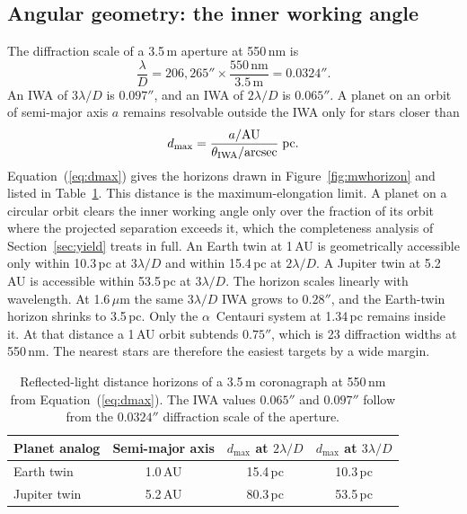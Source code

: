 \subsection{Angular geometry: the inner working angle}

The diffraction scale of a 3.5\,m aperture at 550\,nm is
\begin{equation}
\frac{\lambda}{D} = 206{,}265''\times\frac{550\,\mathrm{nm}}{3.5\,\mathrm{m}}
 = 0.0324''.
\end{equation}
An IWA of $3\lambda/D$ is $0.097''$, and an IWA of $2\lambda/D$ is
$0.065''$. A planet on an orbit of semi-major axis $a$ remains
resolvable outside the IWA only for stars closer than
\begin{equation}
d_{\max} = \frac{a/\mathrm{AU}}{\theta_{\rm IWA}/\mathrm{arcsec}}\;
\mathrm{pc}.
\label{eq:dmax}
\end{equation}
Equation~(\ref{eq:dmax}) gives the horizons drawn in
Figure~\ref{fig:mwhorizon} and listed in Table~\ref{tab:horizon}. This
distance is the maximum-elongation limit. A planet on a circular orbit
clears the inner working angle only over the fraction of its orbit where
the projected separation exceeds it, which the completeness analysis of
Section~\ref{sec:yield} treats in full. An
Earth twin at 1\,AU is geometrically accessible only within
10.3\,pc at $3\lambda/D$ and within 15.4\,pc at $2\lambda/D$. A Jupiter
twin at 5.2\,AU is accessible within 53.5\,pc at $3\lambda/D$. The
horizon scales linearly with wavelength. At 1.6\,$\mu$m the same
$3\lambda/D$ IWA grows to $0.28''$, and the Earth-twin horizon shrinks
to 3.5\,pc. Only the $\alpha$~Centauri system at 1.34\,pc
\cite{vanleeuwen07} remains inside it. At that distance a 1\,AU orbit
subtends $0.75''$, which is 23 diffraction widths at 550\,nm. The
nearest stars are therefore the easiest targets by a wide margin.

\begin{table}[tp]
\centering
\small
\begin{tabular}{lccc}
\toprule
Planet analog & Semi-major axis & $d_{\max}$ at $2\lambda/D$ &
$d_{\max}$ at $3\lambda/D$ \\
\midrule
Earth twin   & 1.0\,AU  & 15.4\,pc & 10.3\,pc \\
Jupiter twin & 5.2\,AU  & 80.3\,pc & 53.5\,pc \\
\bottomrule
\end{tabular}
\caption{Reflected-light distance horizons of a 3.5\,m coronagraph at
550\,nm from Equation~(\ref{eq:dmax}). The IWA values $0.065''$ and
$0.097''$ follow from the $0.0324''$ diffraction scale of the
aperture.}
\label{tab:horizon}
\end{table}

